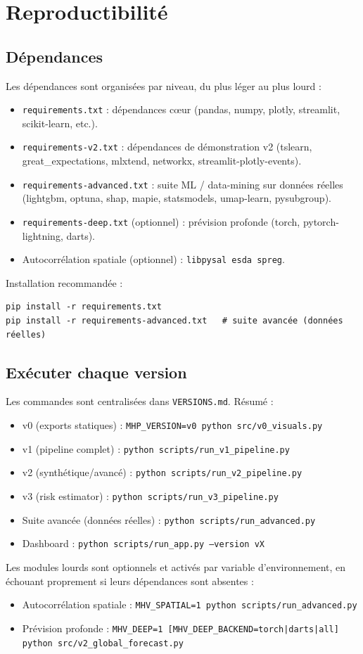 \chapter{Reproductibilité}
\section{Dépendances}
Les dépendances sont organisées par niveau, du plus léger au plus lourd :
\begin{itemize}
    \item \texttt{requirements.txt} : dépendances cœur (pandas, numpy, plotly, streamlit, scikit-learn, etc.).
    \item \texttt{requirements-v2.txt} : dépendances de démonstration v2 (tslearn, great\_expectations, mlxtend, networkx, streamlit-plotly-events).
    \item \texttt{requirements-advanced.txt} : suite ML / data-mining sur données réelles (lightgbm, optuna, shap, mapie, statsmodels, umap-learn, pysubgroup).
    \item \texttt{requirements-deep.txt} (optionnel) : prévision profonde (torch, pytorch-lightning, darts).
    \item Autocorrélation spatiale (optionnel) : \texttt{libpysal esda spreg}.
\end{itemize}
Installation recommandée :
\begin{verbatim}
pip install -r requirements.txt
pip install -r requirements-advanced.txt   # suite avancée (données réelles)
\end{verbatim}

\section{Exécuter chaque version}
Les commandes sont centralisées dans \texttt{VERSIONS.md}. Résumé :
\begin{itemize}
    \item v0 (exports statiques) : \texttt{MHP\_VERSION=v0 python src/v0\_visuals.py}
    \item v1 (pipeline complet) : \texttt{python scripts/run\_v1\_pipeline.py}
    \item v2 (synthétique/avancé) : \texttt{python scripts/run\_v2\_pipeline.py}
    \item v3 (risk estimator) : \texttt{python scripts/run\_v3\_pipeline.py}
    \item Suite avancée (données réelles) : \texttt{python scripts/run\_advanced.py}
    \item Dashboard : \texttt{python scripts/run\_app.py --version vX}
\end{itemize}
Les modules lourds sont optionnels et activés par variable d'environnement, en
échouant proprement si leurs dépendances sont absentes :
\begin{itemize}
    \item Autocorrélation spatiale : \texttt{MHV\_SPATIAL=1 python scripts/run\_advanced.py}
    \item Prévision profonde : \texttt{MHV\_DEEP=1 [MHV\_DEEP\_BACKEND=torch|darts|all] python src/v2\_global\_forecast.py}
\end{itemize}


